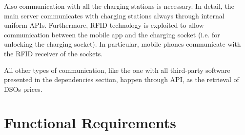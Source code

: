 \documentclass[a4paper]{report}
\begin{document}
Also communication with all the charging stations is necessary. In detail, the main server communicates with charging stations always through internal uniform APIs. Furthermore, RFID technology is exploited to allow communication between the mobile app and the charging socket (i.e. for unlocking the charging socket). In particular, mobile phones communicate with the RFID receiver of the sockets.

All other types of communication, like the one with all third-party software presented in the dependencies section, happen through API, as the retrieval of DSOs prices.



\section{Functional Requirements}
\end{document}

